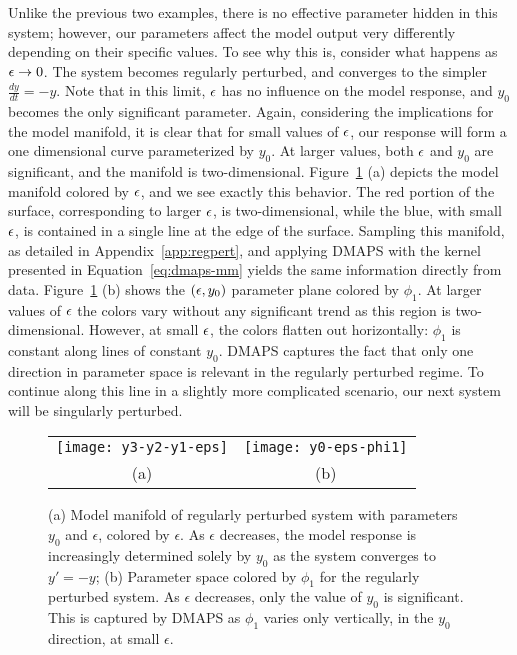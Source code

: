 Unlike the previous two examples, there is no effective parameter
hidden in this system; however, our parameters affect the model output
very differently depending on their specific values. To see why this
is, consider what happens as $\epsilon \rightarrow 0$. The system becomes
regularly perturbed, and converges to the simpler
$\frac{dy}{dt} = -y$. Note that in this limit, $\epsilon$ has no influence
on the model response, and $y_0$ becomes the only significant
parameter. Again, considering the implications for the model manifold,
it is clear that for small values of $\epsilon$, our response will form a
one dimensional curve parameterized by $y_0$. At larger values, both
$\epsilon$ and $y_0$ are significant, and the manifold is
two-dimensional. Figure~\ref{fig:regpert} (a) depicts the model
manifold colored by $\epsilon$, and we see exactly this behavior. The red
portion of the surface, corresponding to larger $\epsilon$, is
two-dimensional, while the blue, with small $\epsilon$, is contained in a
single line at the edge of the surface. Sampling this manifold, as
detailed in Appendix~\ref{app:regpert}, and applying DMAPS with the
kernel presented in Equation~\ref{eq:dmaps-mm} yields the same
information directly from data. Figure~\ref{fig:regpert} (b) shows the
$(\epsilon, y_0)$ parameter plane colored by $\phi_1$. At larger values of
$\epsilon$ the colors vary without any significant trend as this region is
two-dimensional. However, at small $\epsilon$, the colors flatten out
horizontally: $\phi_1$ is constant along lines of constant
$y_0$. DMAPS captures the fact that only one direction in parameter
space is relevant in the regularly perturbed regime. To continue along
this line in a slightly more complicated scenario, our next system
will be singularly perturbed.

\begin{figure}[ht!]
  \centering
  \begin{tabular}{cc}
    \texttt{[image: y3-y2-y1-eps]} &
                                                           \texttt{[image: y0-eps-phi1]} \\
    (a) & (b)\\
  \end{tabular}
  \caption[Model manifold and parameter space of regularly perturbed system]{(a) Model manifold of regularly perturbed system with
    parameters $y_0$ and $\epsilon$, colored by $\epsilon$. As
    $\epsilon$ decreases, the model response is increasingly
    determined solely by $y_0$ as the system converges to $y' = -y$;
    (b) Parameter space colored by $\phi_1$ for the regularly
    perturbed system. As $\epsilon$ decreases, only the value of $y_0$
    is significant. This is captured by DMAPS as $\phi_1$ varies only
    vertically, in the $y_0$ direction, at small
    $\epsilon$. \label{fig:regpert}}
\end{figure}


